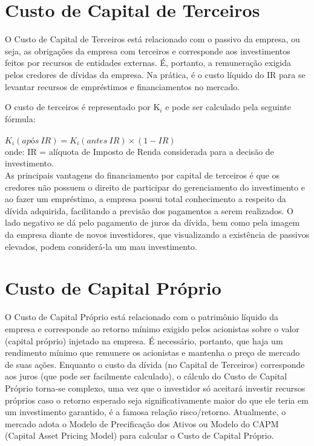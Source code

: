 \documentclass[a4paper,12pt]{article}
\begin{document}
\section{Custo de Capital de Terceiros}

O Custo de Capital de Terceiros está relacionado com o passivo da empresa, ou seja, as obrigações da empresa com terceiros e corresponde aos investimentos feitos por recursos de entidades externas. É, portanto, a remuneração exigida pelos credores de dívidas da empresa. Na prática, é o custo líquido do IR para se levantar recursos de empréstimos e financiamentos no mercado.

O custo de terceiros é representado por K$_{i}$ e pode ser calculado pela seguinte fórmula:\\\\

$K_{i} (após \  IR) = K_{i} (antes \  IR) \times (1-IR)$\\

onde:
IR = alíquota de Imposto de Renda considerada para a decisão de investimento.\\

As principais vantagens do financiamento por capital de terceiros é que os credores não possuem o direito de participar do gerenciamento do investimento e ao fazer um empréstimo, a empresa possui total conhecimento a respeito da dívida adquirida, facilitando a previsão dos pagamentos a serem realizados. O lado negativo se dá pelo pagamento de juros da dívida, bem como pela imagem da empresa diante de novos investidores, que visualizando a existência de passivos elevados, podem considerá-la um mau investimento.

\section{Custo de Capital Próprio}

O Custo de Capital Próprio está relacionado com o patrimônio líquido da empresa e corresponde ao retorno mínimo exigido pelos acionistas sobre o valor (capital próprio) injetado na empresa. É necessário, portanto, que haja um rendimento mínimo que remunere os acionistas e mantenha o preço de mercado de suas ações.
Enquanto o custo da dívida (no Capital de Terceiros) corresponde aos juros (que pode ser facilmente calculado), o cálculo do Custo de Capital Próprio torna-se complexo, uma vez que o investidor só aceitará investir recursos próprios caso o retorno esperado seja significativamente maior do que ele teria em um investimento garantido, é a famosa relação risco/retorno.
Atualmente, o mercado adota o Modelo de Precificação dos Ativos ou Modelo do CAPM (Capital Asset Pricing Model) para calcular o Custo de Capital Próprio.
\end{document}
